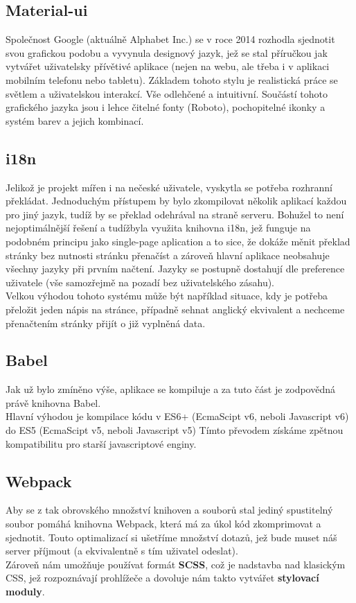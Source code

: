 \subsection{Material-ui}
Společnost Google (aktuálně Alphabet Inc.) se v roce 2014 rozhodla sjednotit svou grafickou podobu a
vyvynula designový jazyk, jež se stal příručkou jak vytvářet uživatelsky přívětivé aplikace (nejen na webu, ale třeba
i v aplikaci mobilním telefonu nebo tabletu). Základem tohoto stylu je realistická práce se světlem
a uživatelskou interakcí. Vše odlehčené a intuitivní. Součástí tohoto grafického jazyka jsou i
lehce čitelné fonty (Roboto), pochopitelné ikonky a systém barev a jejich kombinací.

\subsection{i18n}
Jelikož je projekt mířen i na nečeské uživatele, vyskytla se potřeba rozhranní překládat.
Jednoduchým přístupem by bylo zkompilovat několik aplikací každou pro jiný jazyk, tudíž
by se překlad odehrával na straně serveru. Bohužel to není nejoptimálnější řešení a
tudížbyla využita knihovna i18n, jež funguje na podobném principu jako single-page aplication a
to sice, že dokáže měnit překlad stránky bez nutnosti stránku přenačíst a zároveň hlavní aplikace
neobsahuje všechny jazyky při prvním načtení. Jazyky se postupně dostahují dle preference uživatele
(vše samozřejmě na pozadí bez uživatelského zásahu).\\
Velkou výhodou tohoto systému může být například situace, kdy je potřeba přeložit jeden nápis na stránce,
případně sehnat anglický ekvivalent a nechceme přenačtením stránky přijít o již vyplněná data.

\subsection{Babel}
Jak už bylo zmíněno výše, aplikace se kompiluje a za tuto část je zodpovědná právě knihovna Babel.\\
Hlavní výhodou je kompilace kódu v ES6+ (EcmaScipt v6, neboli Javascript v6) do ES5 (EcmaScipt v5, neboli Javascript v5)
Tímto převodem získáme zpětnou kompatibilitu pro starší javascriptové enginy.

\subsection{Webpack}
Aby se z tak obrovského množství knihoven a souborů stal jediný spustitelný soubor pomáhá
knihovna Webpack, která má za úkol kód zkomprimovat a sjednotit. Touto optimalizací si ušetříme
množství dotazů, jež bude muset náš server příjmout (a ekvivalentně s tím uživatel odeslat).\\
Zároveň nám umožňuje používat formát \textbf{SCSS}, což je nadstavba nad klasickým CSS, jež 
rozpoznávají prohlížeče a dovoluje nám takto vytvářet \textbf{stylovací moduly}.

